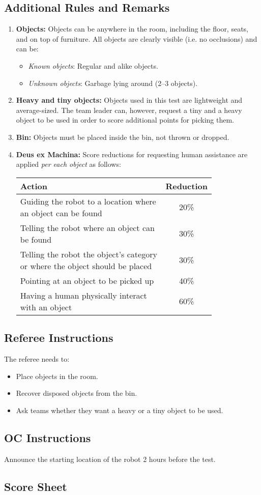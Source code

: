 \subsection*{Additional Rules and Remarks}
\begin{enumerate}[nosep]
	\item \textbf{Objects:}
	Objects can be anywhere in the room, including the floor, seats, and on top of furniture.
	All objects are clearly visible (i.e. no occlusions) and can be:
	\begin{itemize}[nosep]
		\item\textit{Known objects}: Regular and alike objects.
		\item\textit{Unknown objects}: Garbage lying around (2--3 objects).
	\end{itemize}
	\item \textbf{Heavy and tiny objects:} Objects used in this test are lightweight and average-sized.
	The team leader can, however, request a tiny and a heavy object to be used in order to score additional points for picking them.

	\item \textbf{Bin:} Objects must be placed inside the bin, not thrown or dropped.

	\item \textbf{Deus ex Machina:} Score reductions for requesting human assistance are applied \emph{per each object} as follows:
	\begin{table}[h]
		\begin{tabular}{m{0.8\linewidth} c}
			\textbf{Action} & \textbf{Reduction} \\\hline
			Guiding the robot to a location where an object can be found & 20\% \\
			Telling the robot where an object can be found & 30\% \\
			Telling the robot the object's category or where the object should be placed & 30\% \\
			Pointing at an object to be picked up & 40\% \\
			Having a human physically interact with an object & 60\% \\\hline
		\end{tabular}
	\end{table}
\end{enumerate}

\subsection*{Referee Instructions}
The referee needs to:
\begin{itemize}
	\item Place objects in the room.
	\item Recover disposed objects from the bin.
	\item Ask teams whether they want a heavy or a tiny object to be used.
\end{itemize}

\subsection*{OC Instructions}
Announce the starting location of the robot 2 hours before the test.

\subsection*{Score Sheet}

